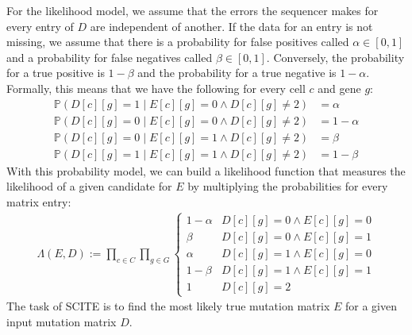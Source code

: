 For the likelihood model, we assume that the errors the sequencer makes for every entry of $D$ are independent of another. If the data for an entry is not missing, we assume that there is a probability for false positives called $\alpha \in [0,1]$ and a probability for false negatives called $\beta \in [0,1]$. Conversely, the probability for a true positive is $1-\beta$ and the probability for a true negative is $1-\alpha$. Formally, this means that we have the following for every cell $c$ and gene $g$:
\begin{align}
    \mathbb{P}(D[c][g] = 1 \mid E[c][g] = 0 \wedge D[c][g] \neq 2) &= \alpha \\
    \mathbb{P}(D[c][g] = 0 \mid E[c][g] = 0 \wedge D[c][g] \neq 2) &= 1-\alpha \\
    \mathbb{P}(D[c][g] = 0 \mid E[c][g] = 1 \wedge D[c][g] \neq 2) &= \beta \\
    \mathbb{P}(D[c][g] = 1 \mid E[c][g] = 1 \wedge D[c][g] \neq 2) &= 1-\beta
\end{align}
With this probability model, we can build a likelihood function that measures the likelihood of a given candidate for $E$ by multiplying the probabilities for every matrix entry:
\begin{align}
    \Lambda(E, D) := \prod_{c \in C} \prod_{g \in G} \begin{cases}
        1-\alpha & D[c][g] = 0 \wedge E[c][g] = 0 \\
        \beta & D[c][g] = 0 \wedge E[c][g] = 1 \\
        \alpha & D[c][g] = 1 \wedge E[c][g] = 0 \\
        1-\beta & D[c][g] = 1 \wedge E[c][g] = 1 \\
        1 & D[c][g] = 2
    \end{cases}
\end{align}
The task of \ac{SCITE} is to find the most likely true mutation matrix $E$ for a given input mutation matrix $D$.

